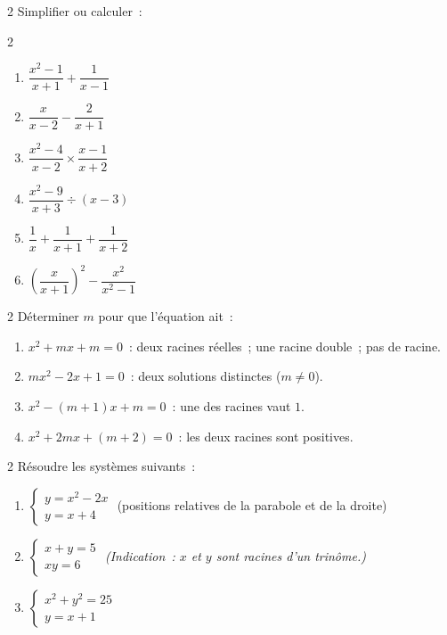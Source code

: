 \begin{exo}{2}
Simplifier ou calculer~:
\begin{multicols}{2}
\begin{enumerate}
  \item $\dfrac{x^2-1}{x+1} + \dfrac{1}{x-1}$
  \item $\dfrac{x}{x-2} - \dfrac{2}{x+1}$
  \item $\dfrac{x^2-4}{x-2} \times \dfrac{x-1}{x+2}$
  \item $\dfrac{x^2-9}{x+3} \div (x-3)$
  \item $\dfrac{1}{x} + \dfrac{1}{x+1} + \dfrac{1}{x+2}$
  \item $\left(\dfrac{x}{x+1}\right)^2 - \dfrac{x^2}{x^2-1}$
\end{enumerate}
\end{multicols}
\end{exo}

\begin{exo}{2}
D\'eterminer $m$ pour que l'\'equation ait~:
\begin{enumerate}
  \item $x^2 + mx + m = 0$~: deux racines r\'eelles~; une racine double~; pas de racine.
  \item $mx^2 - 2x + 1 = 0$~: deux solutions distinctes ($m \ne 0$).
  \item $x^2 - (m+1)x + m = 0$~: une des racines vaut $1$.
  \item $x^2 + 2mx + (m+2) = 0$~: les deux racines sont positives.
\end{enumerate}
\end{exo}

\begin{exo}{2}
R\'esoudre les syst\`emes suivants~:
\begin{enumerate}
  \item $\begin{cases}y = x^2 - 2x \\ y = x + 4\end{cases}$
        (positions relatives de la parabole et de la droite)
  \item $\begin{cases}x + y = 5 \\ xy = 6\end{cases}$
        \emph{(Indication~: $x$ et $y$ sont racines d'un trin\^ome.)}
  \item $\begin{cases}x^2 + y^2 = 25 \\ y = x + 1\end{cases}$
\end{enumerate}
\end{exo}

